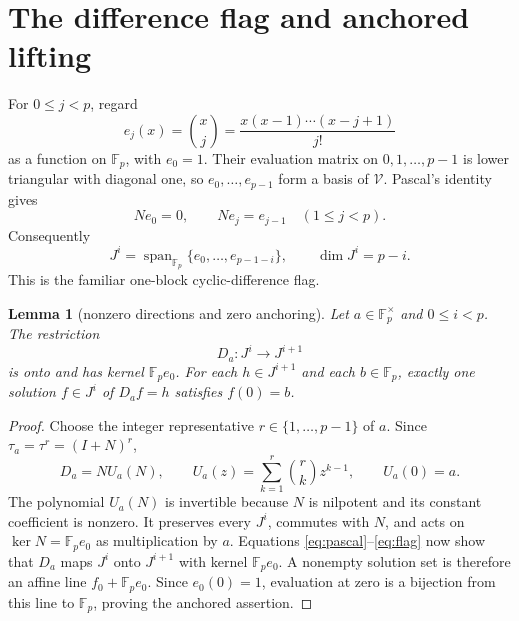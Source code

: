 \documentclass[a4paper,10pt]{amsart}
\newtheorem{lemma}[theorem]{Lemma}
\theoremstyle{remark}
\newcommand{\F}{\mathbb F}
\newcommand{\cV}{\mathcal V}
\newcommand{\Span}{\operatorname{span}}
\begin{document}
\section{The difference flag and anchored lifting}

For $0\le j<p$, regard
\[
 e_j(x)=\binom{x}{j}=\frac{x(x-1)\cdots(x-j+1)}{j!}
\]
as a function on $\F_p$, with $e_0=1$.  Their evaluation matrix on
$0,1,\ldots,p-1$ is lower triangular with diagonal one, so
$e_0,\ldots,e_{p-1}$ form a basis of $\cV$.  Pascal's identity gives
\begin{equation}\label{eq:pascal}
             Ne_0=0,\qquad Ne_j=e_{j-1}\quad(1\le j<p).
\end{equation}
Consequently
\begin{equation}\label{eq:flag}
        J^i=\Span_{\F_p}\{e_0,\ldots,e_{p-1-i}\},
        \qquad \dim J^i=p-i.
\end{equation}
This is the familiar one-block cyclic-difference flag.

\begin{lemma}[nonzero directions and zero anchoring]\label{lem:anchor}
Let $a\in\F_p^\times$ and $0\le i<p$.  The restriction
\[
                       D_a:J^i\longrightarrow J^{i+1}
\]
is onto and has kernel $\F_p e_0$.  For each $h\in J^{i+1}$ and each
$b\in\F_p$, exactly one solution $f\in J^i$ of $D_af=h$ satisfies
$f(0)=b$.
\end{lemma}

\begin{proof}
Choose the integer representative $r\in\{1,\ldots,p-1\}$ of $a$.
Since $\tau_a=\tau^r=(I+N)^r$,
\[
 D_a=N U_a(N),\qquad
 U_a(z)=\sum_{k=1}^{r}\binom rk z^{k-1},\qquad U_a(0)=a.
\]
The polynomial $U_a(N)$ is invertible because $N$ is nilpotent and its
constant coefficient is nonzero.  It preserves every $J^i$, commutes with
$N$, and acts on $\ker N=\F_p e_0$ as multiplication by $a$.  Equations
\eqref{eq:pascal}--\eqref{eq:flag} now show that $D_a$ maps $J^i$ onto
$J^{i+1}$ with kernel $\F_p e_0$.  A nonempty solution set is therefore
an affine line $f_0+\F_p e_0$.  Since $e_0(0)=1$, evaluation at zero is a
bijection from this line to $\F_p$, proving the anchored assertion.
\end{proof}
\end{document}
